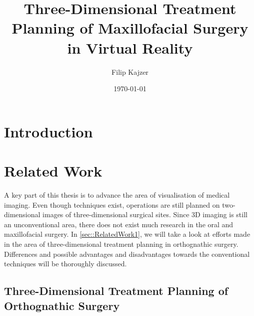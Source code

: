 \documentclass[twoside, parskip]{VRThesis} %
\title{Three-Dimensional Treatment Planning of Maxillofacial Surgery in Virtual Reality}
\author{Filip Kajzer}
\date{\today}
\begin{document}
 



\tableofcontents

\chapter{Introduction}



\chapter{Related Work}

A key part of this thesis is to advance the area of visualisation of medical imaging.
Even though techniques exist, operations are still planned on two-dimensional images of three-dimensional surgical sites.
Since 3D imaging is still an unconventional area, there does not exist much research in the oral and maxillofacial surgery. 
In \ref{sec::RelatedWork1}, we will take a look at efforts made in the area of three-dimensional treatment planning in orthognathic surgery.
Differences and possible advantages and disadvantages towards the conventional techniques will be thoroughly discussed.

\section{\label{sec::RelatedWork1}Three-Dimensional Treatment Planning of Orthognathic Surgery}

\end{document}
